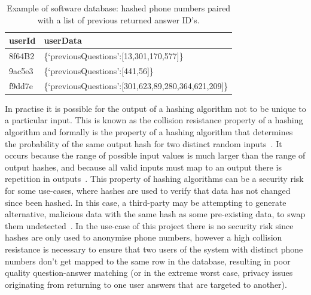 \documentclass{article}
\begin{document}
\begin{table}
\begin{center}
    \begin{tabular}{| l | l |}
    \hline
    userId & userData \\ \hline
    8f64B2 & \{‘previousQuestions’:[13,301,170,577]\} \\ \hline
    9ac5e3 & \{‘previousQuestions’:[441,56]\} \\ \hline
    f9dd7e & \{‘previousQuestions’:[301,623,89,280,364,621,209]\} \\
    \hline
    \end{tabular}
    \caption{Example of software database: hashed phone numbers paired with a list of previous returned answer ID's. }
    \label{table:hashDatabase}
\end{center}
\end{table}

In practise it is possible for the output of a hashing algorithm not to be unique to a particular input.  This is known as the collision resistance property of a hashing algorithm and formally is the property of a hashing algorithm that determines the probability of the same output hash for two distinct random inputs~\cite{mitCryptographyMd5}.  It occurs because the range of possible input values is much larger than the range of output hashes, and because all valid inputs must map to an output there is repetition in outputs~\cite{mitCryptographyMd5}.  This property of hashing algorithms can be a security risk for some use-cases, where hashes are used to verify that data has not changed since been hashed.  In this case, a third-party may be attempting to generate alternative, malicious data with the same hash as some pre-existing data, to swap them undetected~\cite{securityEngineeringHashingAnderson}.  In the use-case of this project there is no security risk since hashes are only used to anonymise phone numbers, however a high collision resistance is necessary to ensure that two users of the system with distinct phone numbers don't get mapped to the same row in the database, resulting in poor quality question-answer matching (or in the extreme worst case, privacy issues originating from returning to one user answers that are targeted to another).
\end{document}
